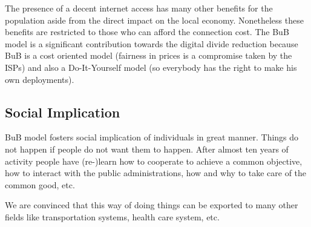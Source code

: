The presence of a decent internet access has many other benefits for the population aside from the direct impact on the local economy. Nonetheless these benefits are restricted to those who can afford the connection cost. The BuB model is a significant contribution towards the digital divide reduction because BuB is a cost oriented model (fairness in prices is a compromise taken by the ISPs) and also a Do-It-Yourself model (so everybody has the right to make his own deployments).


\FloatBarrier
\subsection{Social Implication}
\label{res_social}

BuB model fosters social implication of individuals in great manner. Things do not happen if people do not want them to happen. After almost ten years of activity people have (re-)learn how to cooperate to achieve a common objective, how to interact with the public administrations, how and why to take care of the common good, etc.

We are convinced that this way of doing things can be exported to many other fields like transportation systems, health care system, etc.

